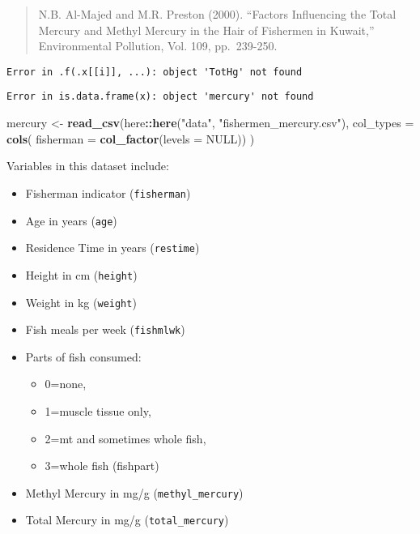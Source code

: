 \documentclass[]{article}
\newenvironment{Shaded}{\begin{snugshade}}{\end{snugshade}}
\newcommand{\KeywordTok}[1]{\textcolor[rgb]{0.13,0.29,0.53}{\textbf{#1}}}
\newcommand{\DataTypeTok}[1]{\textcolor[rgb]{0.13,0.29,0.53}{#1}}
\newcommand{\StringTok}[1]{\textcolor[rgb]{0.31,0.60,0.02}{#1}}
\newcommand{\OtherTok}[1]{\textcolor[rgb]{0.56,0.35,0.01}{#1}}
\newcommand{\OperatorTok}[1]{\textcolor[rgb]{0.81,0.36,0.00}{\textbf{#1}}}
\newcommand{\NormalTok}[1]{#1}
\providecommand{\tightlist}{%
  \setlength{\itemsep}{0pt}\setlength{\parskip}{0pt}}
\begin{document}
\begin{quote}
N.B. Al-Majed and M.R. Preston (2000). ``Factors Influencing the Total
Mercury and Methyl Mercury in the Hair of Fishermen in Kuwait,''
Environmental Pollution, Vol. 109, pp.~239-250.
\end{quote}

\begin{verbatim}
Error in .f(.x[[i]], ...): object 'TotHg' not found
\end{verbatim}

\begin{verbatim}
Error in is.data.frame(x): object 'mercury' not found
\end{verbatim}

\begin{Shaded}
\begin{Highlighting}[]
\NormalTok{mercury <-}\StringTok{ }\KeywordTok{read_csv}\NormalTok{(here}\OperatorTok{::}\KeywordTok{here}\NormalTok{(}\StringTok{"data"}\NormalTok{, }\StringTok{"fishermen_mercury.csv"}\NormalTok{),}
                    \DataTypeTok{col_types =} \KeywordTok{cols}\NormalTok{(}
                      \DataTypeTok{fisherman =} \KeywordTok{col_factor}\NormalTok{(}\DataTypeTok{levels =} \OtherTok{NULL}\NormalTok{))}
\NormalTok{                    )}
\end{Highlighting}
\end{Shaded}

Variables in this dataset include:

\begin{itemize}
\tightlist
\item
  Fisherman indicator (\texttt{fisherman})
\item
  Age in years (\texttt{age})
\item
  Residence Time in years (\texttt{restime})
\item
  Height in cm (\texttt{height})
\item
  Weight in kg (\texttt{weight})
\item
  Fish meals per week (\texttt{fishmlwk})
\item
  Parts of fish consumed:

  \begin{itemize}
  \tightlist
  \item
    0=none,
  \item
    1=muscle tissue only,
  \item
    2=mt and sometimes whole fish,
  \item
    3=whole fish (fishpart)
  \end{itemize}
\item
  Methyl Mercury in mg/g (\texttt{methyl\_mercury})
\item
  Total Mercury in mg/g (\texttt{total\_mercury})
\end{itemize}
\end{document}
